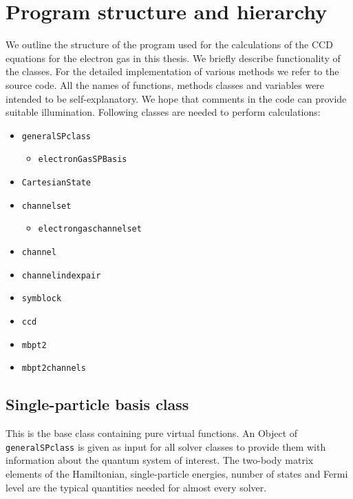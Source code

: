 \documentclass[twoside,english]{uiofysmaster}
\newcommand{\classname}[1]{\texttt{#1}}
\begin{document}
\section{Program structure and hierarchy}

We outline the structure of the program used for the calculations of the CCD equations for the electron gas in this thesis. We briefly describe functionality of the classes. For the detailed implementation of various methods we refer to the source code. All the names of functions, methods classes and variables were intended  to be self-explanatory. We hope that comments in the code can provide suitable illumination. Following classes are needed to perform calculations:

\begin{itemize}
	\item \classname{generalSPclass}
	
	\begin{itemize}
		\item \classname{electronGasSPBasis}
		
		
	\end{itemize}
	\item \classname{CartesianState}	
	\item \classname{channelset}
	\begin{itemize}
		\item \classname{electrongaschannelset}
	\end{itemize}
	\item \classname{channel}
	\item \classname{channelindexpair}
	\item \classname{symblock}
	\item \classname{ccd}
	\item \classname{mbpt2}
	\item \classname{mbpt2channels}
	
\end{itemize}


\subsection{Single-particle basis class}
This is the base class containing pure virtual functions. An Object of \classname{generalSPclass} is given as input for all solver classes to provide them with information about the quantum system of interest. The two-body matrix elements of the Hamiltonian, single-particle energies, number of states and Fermi level are the typical quantities needed for almost every solver. %
\end{document}
